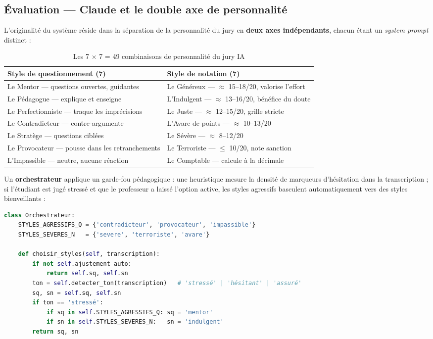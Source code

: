 \documentclass[12pt,a4paper]{report}
\begin{document}
\subsection{Évaluation --- Claude et le double axe de personnalité}
L'originalité du système réside dans la séparation de la personnalité du jury
en \textbf{deux axes indépendants}, chacun étant un \emph{system prompt}
distinct :

\begin{table}[H]
\centering\small
\begin{tabular}{p{6.8cm}p{6.8cm}}
\toprule
\textbf{Style de questionnement (7)} & \textbf{Style de notation (7)} \\
\midrule
Le Mentor --- questions ouvertes, guidantes &
Le Généreux --- $\approx$ 15--18/20, valorise l'effort \\
Le Pédagogue --- explique et enseigne &
L'Indulgent --- $\approx$ 13--16/20, bénéfice du doute \\
Le Perfectionniste --- traque les imprécisions &
Le Juste --- $\approx$ 12--15/20, grille stricte \\
Le Contradicteur --- contre-argumente &
L'Avare de points --- $\approx$ 10--13/20 \\
Le Stratège --- questions ciblées &
Le Sévère --- $\approx$ 8--12/20 \\
Le Provocateur --- pousse dans les retranchements &
Le Terroriste --- $\leq$ 10/20, note sanction \\
L'Impassible --- neutre, aucune réaction &
Le Comptable --- calcule à la décimale \\
\bottomrule
\end{tabular}
\caption{Les 7 $\times$ 7 = 49 combinaisons de personnalité du jury IA}
\end{table}

Un \textbf{orchestrateur} applique un garde-fou pédagogique : une heuristique
mesure la densité de marqueurs d'hésitation dans la transcription ; si
l'étudiant est jugé stressé et que le professeur a laissé l'option active, les
styles agressifs basculent automatiquement vers des styles bienveillants :

\begin{lstlisting}[language=Python, caption={Orchestrateur anti-stress (\texttt{notation/agents.py})}]
class Orchestrateur:
    STYLES_AGRESSIFS_Q = {'contradicteur', 'provocateur', 'impassible'}
    STYLES_SEVERES_N   = {'severe', 'terroriste', 'avare'}

    def choisir_styles(self, transcription):
        if not self.ajustement_auto:
            return self.sq, self.sn
        ton = self.detecter_ton(transcription)   # 'stressé' | 'hésitant' | 'assuré'
        sq, sn = self.sq, self.sn
        if ton == 'stressé':
            if sq in self.STYLES_AGRESSIFS_Q: sq = 'mentor'
            if sn in self.STYLES_SEVERES_N:   sn = 'indulgent'
        return sq, sn
\end{lstlisting}
\end{document}
